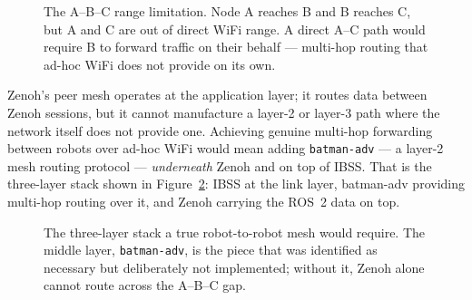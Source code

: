 \begin{figure}[H]
    \centering
    \caption{The A--B--C range limitation. Node A reaches B and B reaches C, but A and C are out of direct WiFi range. A direct A--C path would require B to forward traffic on their behalf --- multi-hop routing that ad-hoc WiFi does not provide on its own.}
    \label{fig:abc}
\end{figure}

Zenoh's peer mesh operates at the application layer; it routes data between Zenoh sessions, but it cannot manufacture a layer-2 or layer-3 path where the network itself does not provide one. Achieving genuine multi-hop forwarding between robots over ad-hoc WiFi would mean adding \texttt{batman-adv} --- a layer-2 mesh routing protocol --- \emph{underneath} Zenoh and on top of IBSS. That is the three-layer stack shown in Figure~\ref{fig:batman_stack}: IBSS at the link layer, batman-adv providing multi-hop routing over it, and Zenoh carrying the ROS~2 data on top.

\begin{figure}[H]
    \centering
    \caption{The three-layer stack a true robot-to-robot mesh would require. The middle layer, \texttt{batman-adv}, is the piece that was identified as necessary but deliberately not implemented; without it, Zenoh alone cannot route across the A--B--C gap.}
    \label{fig:batman_stack}
\end{figure}

